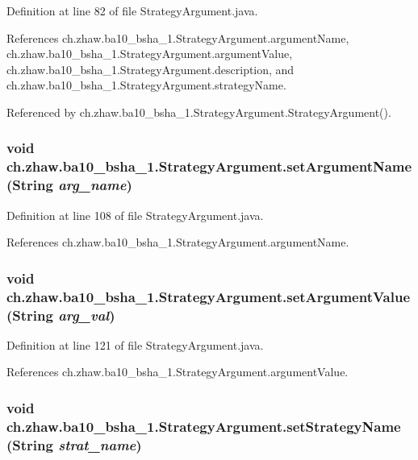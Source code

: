 Definition at line 82 of file StrategyArgument.java.

References ch.zhaw.ba10\_\-bsha\_\-1.StrategyArgument.argumentName, ch.zhaw.ba10\_\-bsha\_\-1.StrategyArgument.argumentValue, ch.zhaw.ba10\_\-bsha\_\-1.StrategyArgument.description, and ch.zhaw.ba10\_\-bsha\_\-1.StrategyArgument.strategyName.

Referenced by ch.zhaw.ba10\_\-bsha\_\-1.StrategyArgument.StrategyArgument().\hypertarget{classch_1_1zhaw_1_1ba10__bsha__1_1_1StrategyArgument_a465e881c78d8ed0156e340c2d0a31b70}{
\subsubsection[{setArgumentName}]{\setlength{\rightskip}{0pt plus 5cm}void ch.zhaw.ba10\_\-bsha\_\-1.StrategyArgument.setArgumentName (String {\em arg\_\-name})}}
\label{classch_1_1zhaw_1_1ba10__bsha__1_1_1StrategyArgument_a465e881c78d8ed0156e340c2d0a31b70}


Definition at line 108 of file StrategyArgument.java.

References ch.zhaw.ba10\_\-bsha\_\-1.StrategyArgument.argumentName.\hypertarget{classch_1_1zhaw_1_1ba10__bsha__1_1_1StrategyArgument_aeab013b0a473256b0c7e3a8db8f3b6c1}{
\subsubsection[{setArgumentValue}]{\setlength{\rightskip}{0pt plus 5cm}void ch.zhaw.ba10\_\-bsha\_\-1.StrategyArgument.setArgumentValue (String {\em arg\_\-val})}}
\label{classch_1_1zhaw_1_1ba10__bsha__1_1_1StrategyArgument_aeab013b0a473256b0c7e3a8db8f3b6c1}


Definition at line 121 of file StrategyArgument.java.

References ch.zhaw.ba10\_\-bsha\_\-1.StrategyArgument.argumentValue.\hypertarget{classch_1_1zhaw_1_1ba10__bsha__1_1_1StrategyArgument_a28088da3c6d84b84795ff51eac7585f6}{
\subsubsection[{setStrategyName}]{\setlength{\rightskip}{0pt plus 5cm}void ch.zhaw.ba10\_\-bsha\_\-1.StrategyArgument.setStrategyName (String {\em strat\_\-name})}}
\label{classch_1_1zhaw_1_1ba10__bsha__1_1_1StrategyArgument_a28088da3c6d84b84795ff51eac7585f6}


